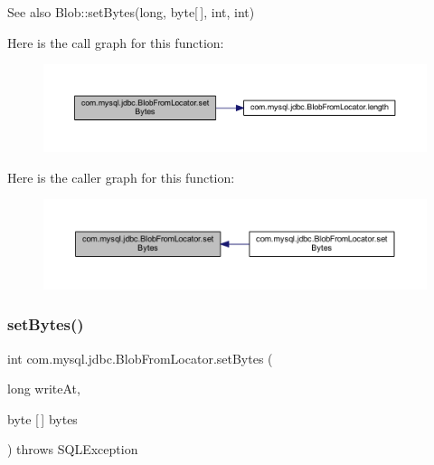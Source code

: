 \begin{DoxySeeAlso}{See also}
Blob\+::set\+Bytes(long, byte\mbox{[}$\,$\mbox{]}, int, int) 
\end{DoxySeeAlso}
Here is the call graph for this function\+:\nopagebreak
\begin{figure}[H]
\begin{center}
\leavevmode
\includegraphics[width=350pt]{classcom_1_1mysql_1_1jdbc_1_1_blob_from_locator_a6aa26db10f30f59b833a900b62e0e1a1_cgraph}
\end{center}
\end{figure}
Here is the caller graph for this function\+:\nopagebreak
\begin{figure}[H]
\begin{center}
\leavevmode
\includegraphics[width=350pt]{classcom_1_1mysql_1_1jdbc_1_1_blob_from_locator_a6aa26db10f30f59b833a900b62e0e1a1_icgraph}
\end{center}
\end{figure}
\mbox{\label{classcom_1_1mysql_1_1jdbc_1_1_blob_from_locator_a564129d2e7b411e349ec285989c47465}} 
\subsubsection{\texorpdfstring{set\+Bytes()}{setBytes()}\hspace{0.1cm}{\footnotesize\ttfamily [2/2]}}
{\footnotesize\ttfamily int com.\+mysql.\+jdbc.\+Blob\+From\+Locator.\+set\+Bytes (\begin{DoxyParamCaption}\item[{long}]{write\+At,  }\item[{byte \mbox{[}$\,$\mbox{]}}]{bytes }\end{DoxyParamCaption}) throws S\+Q\+L\+Exception}

